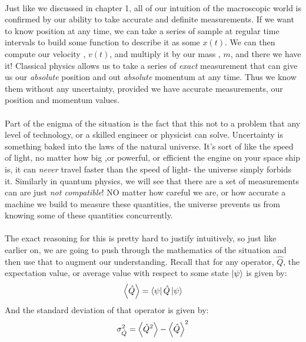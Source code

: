 \documentclass[12pt,letterpaper]{book}
\begin{document}
\paragraph*{}Just like we discussed in chapter 1, all of our intuition of the macroscopic world is confirmed by our ability to take accurate and definite measurements. If we want to know position at any time, we can take a series of sample at regular time intervals to build some function to describe it as some $x(t)$. We can then compute our velocity , $v(t)$, and multiply it by our mass , $m$, and there we have it! Classical physics allows us to take a series of \textit{exact} measurement that can give us our \textit{absolute} position and out \textit{absolute} momentum at any time. Thus we know them without any uncertainty, provided we have accurate measurements, our position and momentum values.
\paragraph*{}Part of the enigma of the situation is the fact that this not to a problem that any level of technology, or a skilled engineer or physicist can solve. Uncertainty is something baked into the laws of the natural universe. It's sort of like the speed of light, no matter how big ,or powerful, or efficient the engine on your space ship is, it can \textit{never} travel faster than the speed of light- the universe simply forbids it. Similarly in quantum physics, we will see that there are a set of measurements can are just \textit{not compatible}! NO matter how careful we are, or how accurate a machine we build to measure these quantities, the universe prevents us from knowing some of these quantities concurrently. 
\paragraph*{}The exact reasoning for this is pretty hard to justify intuitively, so just like earlier on, we are going to push through the mathematics of the situation and then use that to augment our understanding. Recall that for any operator, $\hat{Q}$, the expectation value, or average value with respect to some state $\ket{\psi}$ is given by:
\begin{equation}
\expval{\hat{Q}} = \bra{\psi}\hat{Q}\ket{\psi}
\end{equation}
And the standard deviation of that operator is given by:
\begin{equation}
\sigma^{2}_{\hat{Q}} =  \expval{\hat{Q}^2} - \expval{\hat{Q}}^2
\end{equation}
\end{document}
